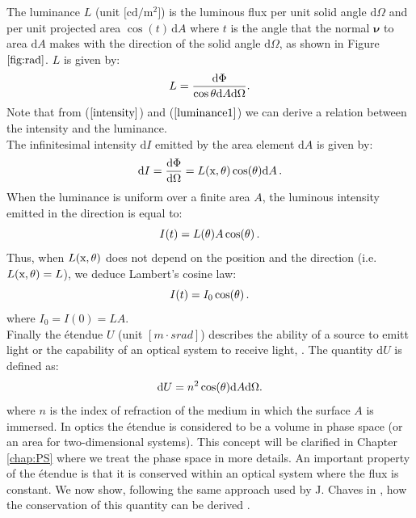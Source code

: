 The luminance $L$ \big(unit $\big[\textrm{cd} / \textrm{m}^2\big]$\big) is the luminous flux per unit solid angle $\textrm{d}\Omega$ and  per unit projected area $\cos(t)\,\textrm{d}A$ where $t$ is the angle that the normal $\boldsymbol{\nu}$ to area $\textrm{d}A$ makes with the direction of the solid angle $\textrm{d}\Omega$, as shown in Figure $\ref{fig:rad}$.  $L$  is given by:
\begin{equation}\label{luminance1}
  L=\frac{\textrm{d}\Phi}{\cos \mbox{$\theta$}\textrm{d}A\textrm{d}\Omega}.
\end{equation}
\noindent Note that from ($\ref{intensity}$) and ($\ref{luminance1}$) we can derive a relation between the intensity and the luminance.\\
The infinitesimal intensity $\textrm{d}I $ emitted by the area element $\textrm{d}A$ is given by:
\begin{equation}
\textrm{d}I = \frac{\textrm{d}\Phi}{\textrm{d}\Omega}= L(\textrm{x},\mbox{$\theta$})\cos(\mbox{$\theta$})\textrm{d}A \,.
\end{equation}
When the luminance is uniform over a finite area $A$, the luminous intensity emitted in the direction \myangle is equal to:
\begin{equation}
I(t) = L(\mbox{$\theta$}) A \cos(\mbox{$\theta$})\,.
\end{equation}
Thus, when $L(\textrm{x},\mbox{$\theta$})$ does not depend on the position and the direction (i.e. $L(\textrm{x},\mbox{$\theta$})=L$), we deduce Lambert's cosine law:
\begin{equation}
I(t) = I_0\cos(\mbox{$\theta$})\,.
\end{equation}
where $I_0 = I(0) = LA$. \\
Finally the \'{e}tendue $U$ (unit $[m \cdot srad]$) describes the ability of a source to emitt light or the capability of an optical system to receive light, \cite{zhu2011etendue}.
The quantity $ \textrm{d}U $ is defined as:
\begin{equation}\label{etendue}
\textrm{d}U = n^2 \cos(\mbox{$\theta$}) \textrm{d}A\textrm{d}\Omega.
\end{equation}
where $n$ is the index of refraction of the medium in which the surface $A$ is immersed. In optics the \'{e}tendue is considered to be a volume in phase space  (or an area for two-dimensional systems). This concept will be clarified in Chapter \ref{chap:PS} where we treat the phase space in more details.
An important property of the \'{e}tendue is that it is conserved within an optical system where the flux is constant. We now show, following the same approach used by J. Chaves in \cite{chaves2015introduction}, how the conservation of this quantity can be derived .
